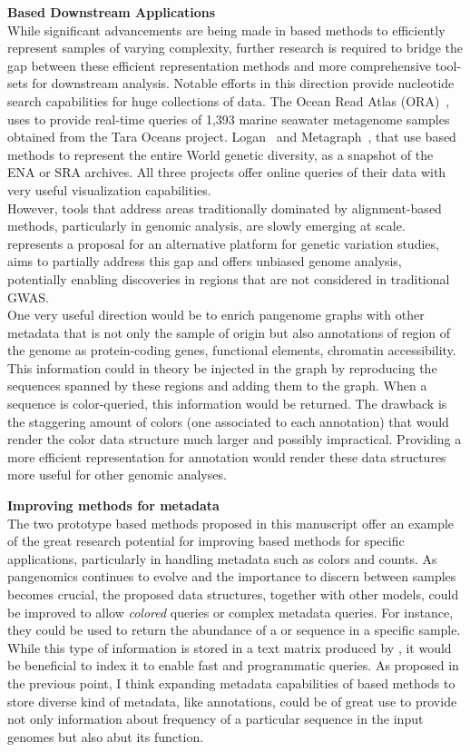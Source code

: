 \textbf{\kmer Based Downstream Applications}\\
While significant advancements are being made in \kmer based methods to efficiently represent samples of varying complexity, further research is required to bridge the gap between these efficient representation methods and more comprehensive tool-sets for downstream analysis.
Notable efforts in this direction provide nucleotide search capabilities for huge collections of data. The Ocean Read Atlas (ORA)~\cite{ora}, uses \kmt to provide real-time queries of 1,393 marine seawater metagenome samples obtained from the Tara Oceans project. Logan~\cite{logan} and Metagraph~\cite{metagraph}, that use \kmer based methods to represent the entire World genetic diversity, as a snapshot of the ENA or SRA archives. All three projects offer online queries of their data with very useful visualization capabilities.\\
However, tools that address areas traditionally dominated by alignment-based methods, particularly in genomic analysis, are slowly emerging at scale. \muset represents a proposal for an alternative platform for genetic variation studies, aims to partially address this gap and offers unbiased genome analysis, potentially enabling discoveries in regions that are not considered in traditional GWAS.\\ One very useful direction would be to enrich pangenome graphs with other metadata that is not only the sample of origin but also annotations of region of the genome as protein-coding genes, functional elements, chromatin accessibility. This information could in theory be injected in the graph by reproducing the sequences spanned by these regions and adding them to the graph. When a sequence is color-queried, this information would be returned. The drawback is the staggering amount of colors (one associated to each annotation) that would render the color data structure much larger and possibly impractical. Providing a more efficient representation for annotation would render these data structures more useful for other genomic analyses.


\textbf{Improving methods for metadata}\\
The two prototype \kmer based methods proposed in this manuscript offer an example of the great research potential for improving \kmer based methods for specific applications, particularly in handling metadata such as colors and counts.
As pangenomics continues to evolve and the importance to discern between samples becomes crucial, the proposed data structures, together with other models, could be improved to allow \emph{colored} queries or complex metadata queries. For instance, they could be used to return the abundance of a \kmer or sequence in a specific sample. While this type of information is stored in a text matrix produced by \muset, it would be beneficial to index it to enable fast and programmatic queries. As proposed in the previous point, I think expanding metadata capabilities of \kmer based methods to store diverse kind of metadata, like annotations, could be of great use to provide not only information about frequency of a particular sequence in the input genomes but also abut its function.